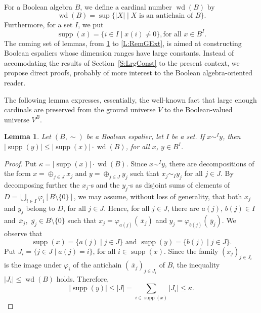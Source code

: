 \documentclass[psamsfonts,reqno]{memo-l}
\theoremstyle{plain}
\newtheorem{lemma}{Lemma}[section]
\theoremstyle{definition}
\theoremstyle{remark}
\numberwithin{equation}{section}
\DeclareMathOperator{\wdt}{wd}
\DeclareMathOperator{\supp}{supp}
\newcommand{\ol}[1]{\,\overline{\!#1}}
\newcommand{\set}[1]{\{#1\}}
\newcommand{\setm}[2]{\set{#1\mid#2}}
\begin{document}
For a Boolean algebra $B$, we define a
cardinal number $\wdt(B)$\index{wzzdt@$\wdt(B)$|ii} by
   \[
   \wdt(B)=\sup\setm{|X|}{X\text{ is an antichain of }B}.
   \]
Furthermore, for a set $I$, we put\index{szzupp@$\supp(x)$|ii}
   \[
   \supp(x)=\setm{i\in I}{x(i)\neq 0},\text{for all }x\in B^I.
   \]
The coming set of lemmas, from \ref{L:PresCard} to \ref{L:RemGExt}, is aimed
at constructing Boolean espaliers whose
dimension ranges have large constants. Instead of
accomodating the results of Section~\ref{S:LrgConst} to the present context,
we propose direct proofs, probably of more interest to the Boolean
algebra-oriented reader.

The following lemma expresses, essentially, the well-known fact that
large enough cardinals are preserved from the ground universe $V$ to the
Boolean-valued universe $V^B$.

\begin{lemma}\label{L:PresCard}
Let $(B,\sim)$ be a Boolean espalier, let
$I$ be a set. If $x\sim^Iy$, then $|\supp(y)|\leq|\supp(x)|\cdot\wdt(B)$,
for all $x$,
$y\in B^I$.
\end{lemma}

\begin{proof}
Put $\kappa=|\supp(x)|\cdot\wdt(B)$. Since $x\sim^Iy$, there are
decompositions of the form $x=\oplus_{j\in J}x_j$ and $y=\oplus_{j\in J}y_j$
such that $x_j\sim_Iy_j$ for all $j\in J$. By decomposing further the
$x_j$-s and the $y_j$-s as disjoint sums of elements of
$D=\bigcup_{i\in I}\varphi_i[B\setminus\set{0}]$, we may assume, without loss
of generality, that both $x_j$ and $y_j$ belong to $D$, for all $j\in J$.
Hence, for all $j\in J$, there are $a(j)$, $b(j)\in I$ and $\ol{x}_j$,
$\ol{y_j}\in B\setminus\set{0}$ such that $x_j=\varphi_{a(j)}(\ol{x}_j)$ and
$y_j=\varphi_{b(j)}(\ol{y}_j)$. We observe that
   \[
   \supp(x)=\setm{a(j)}{j\in J}\text{ and }\supp(y)=\setm{b(j)}{j\in J}.
   \]
Put $J_i=\setm{j\in J}{a(j)=i}$, for all $i\in\supp(x)$. Since the family
$(x_j)_{j\in J_i}$ is the image under $\varphi_i$ of the
antichain
$(\ol{x}_j)_{j\in J_i}$ of $B$, the inequality
$|J_i|\leq\wdt(B)$ holds. Therefore,
   \begin{equation}
   |\supp(y)|\leq|J|=\sum_{i\in\supp(x)}|J_i|\leq\kappa.\tag*{\qed}
   \end{equation}
\renewcommand{\qed}{}
\end{proof}
\end{document}
